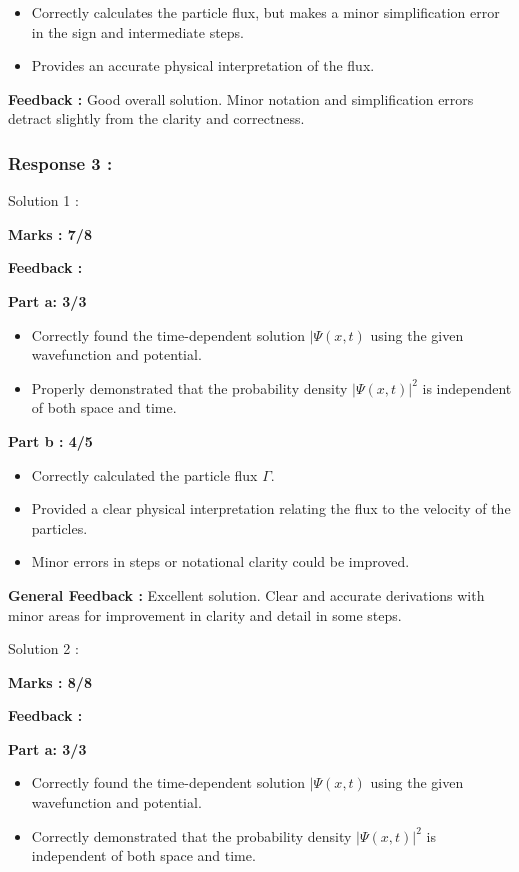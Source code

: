 \documentclass[a4paper,11pt]{article}
\begin{document}
\begin{itemize}
    \item Correctly calculates the particle flux, but makes a minor simplification error in the sign and intermediate steps.
    \item Provides an accurate physical interpretation of the flux.
\end{itemize}

\textbf{Feedback :}
Good overall solution. Minor notation and simplification errors detract slightly from the clarity and correctness.



\subsubsection*{Response 3 :}

Solution 1 :

\textbf{Marks : 7/8}

\textbf{Feedback :}

\textbf{Part a: 3/3}
\begin{itemize}
    \item Correctly found the time-dependent solution $|\Psi (x,t)$ using the given wavefunction and potential.
    \item Properly demonstrated that the probability density $|\Psi (x,t)|^2$ is independent of both space and time.
\end{itemize}

\textbf{Part b : 4/5}

\begin{itemize}
    \item Correctly calculated the particle flux $\Gamma$.
    \item Provided a clear physical interpretation relating the flux to the velocity of the particles.
    \item Minor errors in steps or notational clarity could be improved.
\end{itemize}

\textbf{General Feedback :}
Excellent solution. Clear and accurate derivations with minor areas for improvement in clarity and detail in some steps.


Solution 2 :

\textbf{Marks : 8/8}

\textbf{Feedback :}

\textbf{Part a: 3/3}
\begin{itemize}
    \item Correctly found the time-dependent solution $|\Psi (x,t)$ using the given wavefunction and potential.
    \item Correctly demonstrated that the probability density $|\Psi (x,t)|^2$ is independent of both space and time.
\end{itemize}
\end{document}
